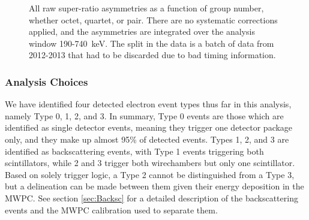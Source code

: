 \begin{figure}
  \caption{All raw super-ratio asymmetries as a function of group number, whether octet, quartet, or pair.
    There are no systematic corrections applied, and the asymmetries are integrated over the analysis window 190-740~keV.
    The split in the data is a batch of data from 2012-2013 that had to be discarded due to bad timing information.}
  \label{fig:RawAsymms}
\end{figure}

\subsubsection{Analysis Choices} \label{sssec::anaChoices}

We have identified four detected electron event types thus far in this analysis, namely Type 0, 1,
2, and 3. In summary, Type 0 events are those which are identified as single detector events, meaning they
trigger one detector package only, and they make up almost 95\% of detected events. Types 1, 2, and 3
are identified as backscattering events, with Type 1 events triggering both scintillators, while 2 and 3
trigger both wirechambers but only one scintillator. Based on solely trigger logic, a Type 2 cannot be
distinguished from a Type 3, but a delineation can be made between them given their energy deposition
in the MWPC. See section \ref{sec:Backsc} for a detailed description of the backscattering events and
the MWPC calibration used to separate them.

